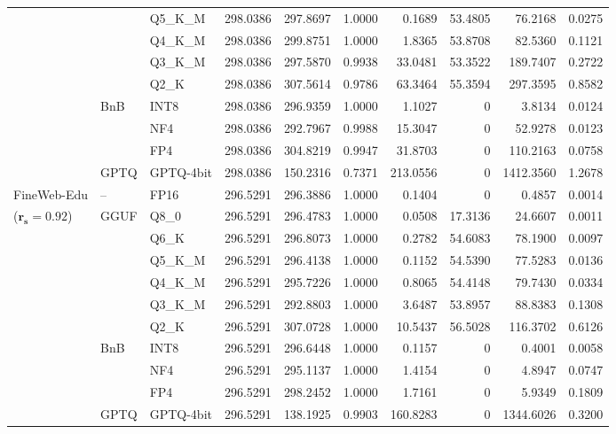 \begin{table}[t]
{\begin{tabular}{ll l rrrrrrr}
 &  & Q5\_K\_M & 298.0386 & 297.8697 & 1.0000 & 0.1689 & 53.4805 & 76.2168 & 0.0275 \\
 &  & Q4\_K\_M & 298.0386 & 299.8751 & 1.0000 & 1.8365 & 53.8708 & 82.5360 & 0.1121 \\
 &  & Q3\_K\_M & 298.0386 & 297.5870 & 0.9938 & 33.0481 & 53.3522 & 189.7407 & 0.2722 \\
 &  & Q2\_K & 298.0386 & 307.5614 & 0.9786 & 63.3464 & 55.3594 & 297.3595 & 0.8582 \\
 & BnB & INT8 & 298.0386 & 296.9359 & 1.0000 & 1.1027 & \cellcolor{cyan!12} $0$ & 3.8134 & 0.0124 \\
 &  & NF4 & 298.0386 & 292.7967 & 0.9988 & 15.3047 & \cellcolor{cyan!12} $0$ & 52.9278 & 0.0123 \\
 &  & FP4 & 298.0386 & 304.8219 & 0.9947 & 31.8703 & \cellcolor{cyan!12} $0$ & 110.2163 & 0.0758 \\
 & GPTQ & GPTQ-4bit & 298.0386 & 150.2316 & \cellcolor{red!35} 0.7371 & \cellcolor{red!35} 213.0556 & \cellcolor{cyan!12} $0$ & \cellcolor{red!35} 1412.3560 & \cellcolor{red!35} 1.2678 \\
\midrule
FineWeb-Edu & -- & FP16 & 296.5291 & 296.3886 & 1.0000 & 0.1404 & \cellcolor{cyan!12} $0$ & 0.4857 & 0.0014 \\
{\small ($\mathbf{r_s{=}0.92}$)} & GGUF & Q8\_0 & 296.5291 & 296.4783 & 1.0000 & 0.0508 & 17.3136 & 24.6607 & 0.0011 \\
 &  & Q6\_K & 296.5291 & 296.8073 & 1.0000 & 0.2782 & 54.6083 & 78.1900 & 0.0097 \\
 &  & Q5\_K\_M & 296.5291 & 296.4138 & 1.0000 & 0.1152 & 54.5390 & 77.5283 & 0.0136 \\
 &  & Q4\_K\_M & 296.5291 & 295.7226 & 1.0000 & 0.8065 & 54.4148 & 79.7430 & 0.0334 \\
 &  & Q3\_K\_M & 296.5291 & 292.8803 & 1.0000 & 3.6487 & 53.8957 & 88.8383 & 0.1308 \\
 &  & Q2\_K & 296.5291 & 307.0728 & 1.0000 & 10.5437 & 56.5028 & 116.3702 & 0.6126 \\
 & BnB & INT8 & 296.5291 & 296.6448 & 1.0000 & 0.1157 & \cellcolor{cyan!12} $0$ & 0.4001 & 0.0058 \\
 &  & NF4 & 296.5291 & 295.1137 & 1.0000 & 1.4154 & \cellcolor{cyan!12} $0$ & 4.8947 & 0.0747 \\
 &  & FP4 & 296.5291 & 298.2452 & 1.0000 & 1.7161 & \cellcolor{cyan!12} $0$ & 5.9349 & 0.1809 \\
 & GPTQ & GPTQ-4bit & 296.5291 & 138.1925 & 0.9903 & 160.8283 & \cellcolor{cyan!12} $0$ & 1344.6026 & 0.3200 \\

\end{tabular}}
\end{table}
